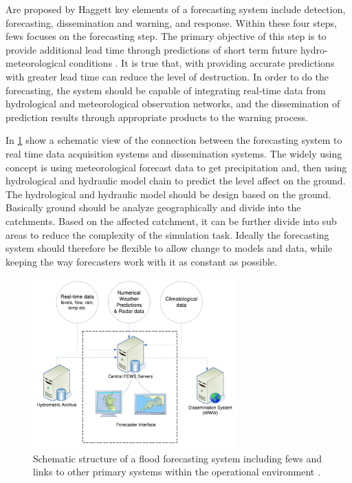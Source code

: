 Are proposed by Haggett \cite{Haggett1998AnWales} key elements of a forecasting system include detection, forecasting, dissemination and warning, and response. Within these four steps, \acrshort{fews} focuses on the forecasting step. The primary objective of this step is to provide additional lead time through predictions of short term future hydro-meteorological conditions \cite{Werner2005FloodCatchments}. It is true that, with providing accurate predictions with greater lead time can reduce the level of destruction. In order to do the forecasting, the system should be capable of integrating real-time data from hydrological and meteorological observation networks, and the dissemination of prediction results through appropriate products to the warning process.

In  \cref{fi:fews_schematic} show a schematic view of the connection between the forecasting system to real time data acquisition systems and dissemination systems. The widely using concept is using meteorological forecast data to get precipitation and, then using hydrological and hydraulic model chain to predict the level affect on the ground. The hydrological and hydraulic model should be design based on the ground. Basically ground should be analyze geographically and divide into the catchments. Based on the affected catchment, it can be further divide into sub areas to reduce the complexity of the simulation task. Ideally the forecasting system should therefore be flexible to allow change to models and data, while keeping the way forecasters work with it as constant as possible.

\begin{figure}[htp]
    \centering
    \includegraphics[width=0.7\textwidth]{lit/fews/Schematic-structure-of-a-fl-ood-forecasting-system-showing-the-position-of-Delft-FEWS_W640.png}
    \caption[Schematic structure of a flood forecasting system including \acrshort{fews} and links to other primary systems within the operational environment]{Schematic structure of a flood forecasting system including \acrshort{fews} and links to other primary systems within the operational environment \cite{Werner2013TheSystem}.}
    \label{fi:fews_schematic}
\end{figure}

